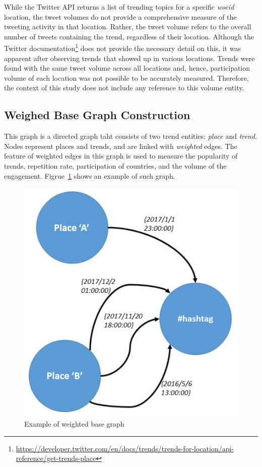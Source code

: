 \documentclass[conference]{IEEEtran}
\begin{document}
While the Twitter API returns a list of trending topics for a specific
{\emph{woeid}} location, the tweet volumes do not provide a
comprehensive measure of the tweeting activity in that
location. Rather, the tweet volume refers to the overall number of
tweets containing the trend, regardless of their location. Although
the Twitter
documentation\footnote{\url{https://developer.twitter.com/en/docs/trends/trends-for-location/api-reference/get-trends-place}}
does not provide the necessary detail on this, it was apparent after
observing trends that showed up in various locations. Trends were
found with the same tweet volume across all locations and, hence,
participation volume of each location was not possible to be
accurately measured. Therefore, the context of this study does not
include any reference to this volume entity.

\subsection{Weighed Base Graph Construction}

This graph is a directed graph taht consists of two trend entities:
{\emph{place}} and {\emph{trend}}. Nodes represent places and
trends, and are linked with {\emph{weighted}} edges. The feature 
of weighted edges in this graph is used to measure the popularity 
of trends, repetition rate, participation of countries, and the volume 
of the engagement. Figrue~\ref{fig:basegraph} shows an example 
of such graph.

\begin{figure}[htb] \centering
\includegraphics[width=\columnwidth]{images/base_graph.png}
\caption{Example of weighted base graph}
\label{fig:basegraph}
\end{figure}
\end{document}
